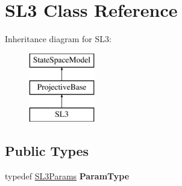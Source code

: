 \hypertarget{classSL3}{\section{S\-L3 Class Reference}
\label{classSL3}
}
Inheritance diagram for S\-L3\-:\begin{figure}[H]
\begin{center}
\leavevmode
\includegraphics[height=3.000000cm]{classSL3}
\end{center}
\end{figure}
\subsection*{Public Types}
\begin{DoxyCompactItemize}
\item 
\hypertarget{classSL3_a29f7c85c98d4c8346d6d8a39aa32764a}{typedef \hyperlink{structSL3Params}{S\-L3\-Params} {\bfseries Param\-Type}}\label{classSL3_a29f7c85c98d4c8346d6d8a39aa32764a}

\end{DoxyCompactItemize}
